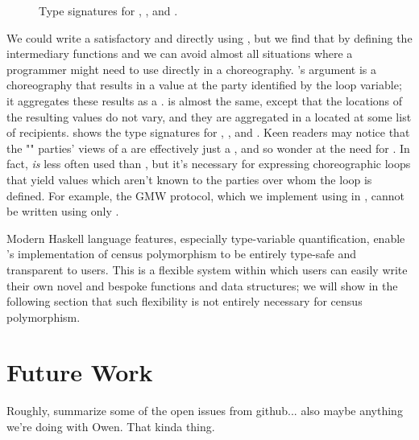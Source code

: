 \begin{figure*}[tbhp]
  \begin{mdframed}
    \inputminted[xleftmargin=10pt,linenos,fontsize=\scriptsize]{haskell}{figures/census-poly-haskell.hs.txt}
    \caption{
        Type signatures for , , and .
    }
    \label{fig:census-poly-haskell}
  \end{mdframed}
\end{figure*}

We could write a satisfactory  and  directly using ,
but we find that by defining the intermediary functions  and 
we can avoid almost all situations where a programmer might need to use  directly in a choreography.
's argument is a choreography that results in a  value at the party identified by the loop variable;
it aggregates these results as a .
 is almost the same, except that the locations of the resulting values do not vary,
and they are aggregated in a  located at some list of recipients.
 shows the type signatures for , , and .
Keen readers may notice that the "" parties' views of a  are effectively just a ,
and so wonder at the need for .
In fact,  \emph{is} less often used than ,
but it's necessary for expressing choreographic loops that yield values which aren't known to the parties over whom the loop is defined.
For example, the GMW protocol, which we implement using \MultiChor in , cannot be written using only .

Modern Haskell language features, especially type-variable quantification,
enable \MultiChor's implementation of census polymorphism to be entirely type-safe and transparent to users.
This is a flexible system within which users can easily write their own novel and bespoke functions and data structures;
we will show in the following section that such flexibility is not entirely necessary for census polymorphism.


\section{Future Work}
\label{sec:future-implementation}
Roughly, summarize some of the open issues from github...
also maybe anything we're doing with Owen. That kinda thing.



